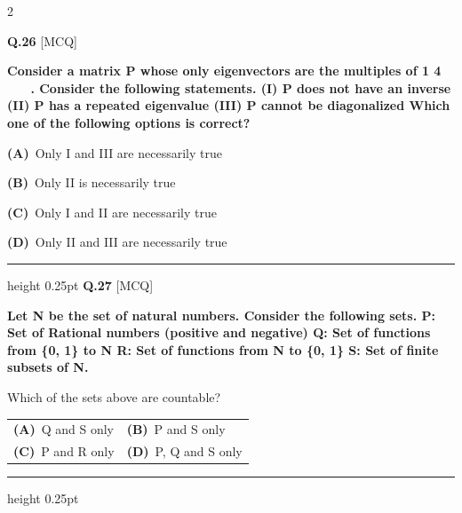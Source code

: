 \documentclass[a4paper,10pt,twoside]{article}
\begin{document}
\begin{multicols}{2}
\vspace{6pt}
\vspace{3pt}

\noindent\textbf{Q.26} \hfill {\footnotesize\textsf{[MCQ]}}
\par\vspace{2pt}
{\bfseries Consider a matrix P whose only eigenvectors are the multiples of 1
4



.
Consider the following statements.
(I) P does not have an inverse
(II) P has a repeated eigenvalue
(III) P cannot be diagonalized
Which one of the following options is correct? \par}
\par\vspace{2pt}\noindent
\textbf{(A)}~Only I and III are necessarily true\par\vspace{2pt}\noindent
\textbf{(B)}~Only II is necessarily true\par\vspace{2pt}\noindent
\textbf{(C)}~Only I and II are necessarily true\par\vspace{2pt}\noindent
\textbf{(D)}~Only II and III are necessarily true
\par\vspace{6pt}\hrule height 0.25pt\vspace{6pt}
\noindent\textbf{Q.27} \hfill {\footnotesize\textsf{[MCQ]}}
\par\vspace{2pt}
{\bfseries Let N be the set of natural numbers. Consider the following sets.
P: Set of Rational numbers (positive and negative)
Q: Set of functions from \{0, 1\} to N
R: Set of functions from N to \{0, 1\}
S: Set of finite subsets of N.
\par\smallskip
Which of the sets above are countable? \par}
\par\vspace{2pt}\noindent
\begin{tabular*}{\columnwidth}{@{\extracolsep{\fill}}p{}p{}@{}}
\textbf{(A)}~Q and S only & \textbf{(B)}~P and S only \\
\addlinespace[2pt]
\textbf{(C)}~P and R only & \textbf{(D)}~P, Q and S only
\end{tabular*}
\par\vspace{6pt}\hrule height 0.25pt\vspace{6pt}

\end{multicols}
\end{document}
